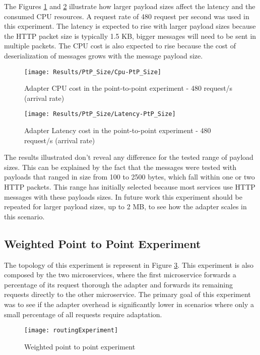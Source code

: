 The Figures  \ref{fig:payloadCpuPtP} and \ref{fig:payloadLatPtP} illustrate how larger payload sizes affect the latency and the consumed CPU resources.
A request rate of 480 request per second was used in this experiment.
The latency is expected to rise with larger payload sizes because the HTTP packet size is typically 1.5 KB, bigger messages will need to be sent in multiple packets.
The CPU cost is also expected to rise because the cost of deserialization of messages grows with the message payload size.

\begin{figure}[htbp]
    \centering
    \centerline{\texttt{[image: Results/PtP\_Size/Cpu-PtP\_Size]}}
    \caption{Adapter CPU cost in the point-to-point experiment - 480 request/s (arrival rate)}
    \label{fig:payloadCpuPtP}
\end{figure}

\begin{figure}[htbp]
    \centering
    \centerline{\texttt{[image: Results/PtP\_Size/Latency-PtP\_Size]}}
    \caption{Adapter Latency cost in the point-to-point experiment - 480 request/s (arrival rate)}
    \label{fig:payloadLatPtP}
\end{figure}

The results illustrated don't reveal any difference for the tested range of payload sizes.
This can be explained by the fact that the messages were tested with payloads that ranged in size from 100 to 2500 bytes, which fall within one or two HTTP packets.
This range has initially selected because most services use HTTP messages with these payloads sizes.
In future work this experiment should be repeated for larger payload sizes, up to 2 MB, to see how the adapter scales in this scenario.

\subsection{Weighted Point to Point Experiment}

The topology of this experiment is represent in Figure \ref{fig:routExp}.
This experiment is also composed by the two microservices, where the first microservice forwards a percentage of its request thorough the adapter
and forwards its remaining requests directly to the other microservice.
The primary goal of this experiment was to see if the adapter overhead is significantly lower in scenarios where only a small percentage of all requests require adaptation.

\begin{figure}[htbp]
    \centering
    \centerline{\texttt{[image: routingExperiment]}}
    \caption{Weighted point to point experiment}
    \label{fig:routExp}
\end{figure}

